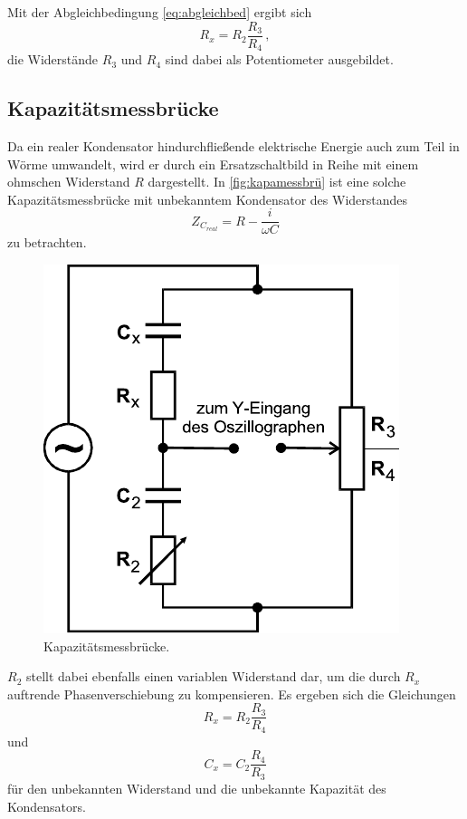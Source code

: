 Mit der Abgleichbedingung \eqref{eq:abgleichbed} ergibt sich
\begin{equation}
    R_x = R_2 \frac{R_3}{R_4} \,,
    \label{eq:resxWheatstone}
\end{equation}
die Widerstände $R_3$ und $R_4$ sind dabei als Potentiometer ausgebildet.


\subsection{Kapazitätsmessbrücke}
\label{subsec:kapamessbrü}

Da ein realer Kondensator hindurchfließende elektrische Energie auch zum Teil in Wörme umwandelt, wird er durch ein Ersatzschaltbild in Reihe mit einem ohmschen Widerstand $R$ dargestellt. 
In \autoref{fig:kapamessbrü} ist eine solche Kapazitätsmessbrücke mit unbekanntem Kondensator des Widerstandes
\begin{equation*}
    Z_{C_{real}} = R - \frac{i}{ω C}
\end{equation*} zu betrachten.

\begin{figure}[H]
    \centering
    \includegraphics{figures/Kapazitätsmessbrücke.pdf}
    \caption{Kapazitätsmessbrücke\cite{ap07}.}
    \label{fig:kapamessbrü}
\end{figure}

$R_2$ stellt dabei ebenfalls einen variablen Widerstand dar, um die durch $R_x$ auftrende Phasenverschiebung zu kompensieren.
Es ergeben sich die Gleichungen
\begin{equation}
    R_x = R_2 \frac{R_3}{R_4}
\end{equation}
und 
\begin{equation}
    C_x = C_2 \frac{R_4}{R_3}
\end{equation}
für den unbekannten Widerstand und die unbekannte Kapazität des Kondensators.


